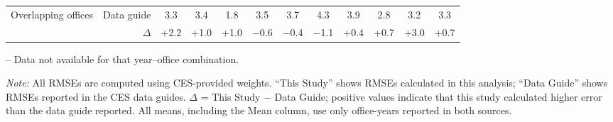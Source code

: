 \begin{table}[p]
{\begin{threeparttable}
\begin{tabular}{lrcccccccccc}
Overlapping offices & Data guide & 3.3 & 3.4 & 1.8 & 3.5 & 3.7 & 4.3 & 3.9 & 2.8 & 3.2 & 3.3 \\
 & $\Delta$ & +2.2 & +1.0 & +1.0 & $-$0.6 & $-$0.4 & $-$1.1 & +0.4 & +0.7 & +3.0 & +0.7 \\
\bottomrule
\end{tabular}
\begin{tablenotes}
\footnotesize
\item -- Data not available for that year--office combination.
\item \textit{Note:} All RMSEs are computed using CES-provided weights. ``This Study'' shows RMSEs calculated in this analysis; ``Data Guide'' shows RMSEs reported in the CES data guides. $\Delta$ = This Study $-$ Data Guide; positive values indicate that this study calculated higher error than the data guide reported. All means, including the Mean column, use only office-years reported in both sources.
\end{tablenotes}
\end{threeparttable}%
}
\end{table}